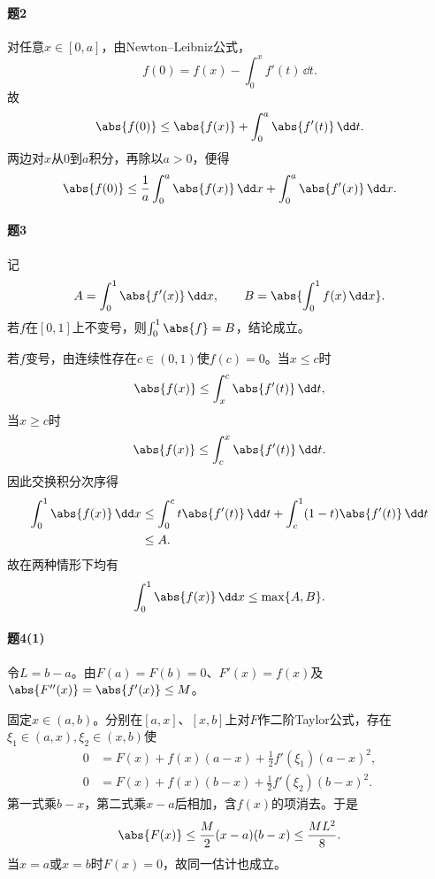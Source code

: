 \paragraph{题2}
\begin{xsolution}
对任意$x\in[0,a]$，由Newton--Leibniz公式，
\[
 f(0)=f(x)-\int_0^xf'(t)\,\dd t.
\]
故
\[
 \abs{f(0)}\le\abs{f(x)}+\int_0^a\abs{f'(t)}\,\dd t.
\]
两边对$x$从0到$a$积分，再除以$a>0$，便得
\[
 \abs{f(0)}\le\frac1a\int_0^a\abs{f(x)}\,\dd x
 +\int_0^a\abs{f'(x)}\,\dd x.
\]
\end{xsolution}

\paragraph{题3}
\begin{xsolution}
记
\[
 A=\int_0^1\abs{f'(x)}\,\dd x,
 \qquad
 B=\abs{\int_0^1f(x)\,\dd x}.
\]
若$f$在$[0,1]$上不变号，则$\int_0^1\abs{f}=B$，结论成立。

若$f$变号，由连续性存在$c\in(0,1)$使$f(c)=0$。当$x\le c$时
\[
 \abs{f(x)}\le\int_x^c\abs{f'(t)}\,\dd t,
\]
当$x\ge c$时
\[
 \abs{f(x)}\le\int_c^x\abs{f'(t)}\,\dd t.
\]
因此交换积分次序得
\begin{align*}
\int_0^1\abs{f(x)}\,\dd x
&\le\int_0^ct\abs{f'(t)}\,\dd t
 +\int_c^1(1-t)\abs{f'(t)}\,\dd t\\
&\le A.
\end{align*}
故在两种情形下均有
\[
 \int_0^1\abs{f(x)}\,\dd x\le\max\{A,B\}.
\]
\end{xsolution}

\paragraph{题4(1)}
\begin{xsolution}
令$L=b-a$。由$F(a)=F(b)=0$、$F'(x)=f(x)$及$\abs{F''(x)}=\abs{f'(x)}\le M$。

固定$x\in(a,b)$。分别在$[a,x]$、$[x,b]$上对$F$作二阶Taylor公式，存在$\xi_1\in(a,x),\xi_2\in(x,b)$使
\begin{align*}
0&=F(x)+f(x)(a-x)+\frac12f'(\xi_1)(a-x)^2,\\
0&=F(x)+f(x)(b-x)+\frac12f'(\xi_2)(b-x)^2.
\end{align*}
第一式乘$b-x$，第二式乘$x-a$后相加，含$f(x)$的项消去。于是
\[
 \abs{F(x)}
 \le\frac M2(x-a)(b-x)
 \le\frac{ML^2}{8}.
\]
当$x=a$或$x=b$时$F(x)=0$，故同一估计也成立。
\end{xsolution}

